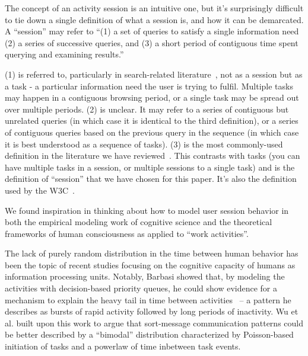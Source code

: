 The concept of an activity session is an intuitive one, but it's surprisingly difficult to tie down a single definition of what a session is, and how it can be demarcated.  A ``session'' may refer to ``(1) a set of queries to satisfy a single information need (2) a series of successive queries, and (3) a short period of contiguous time spent querying and examining results.''~\cite{jones2008beyond}

(1) is referred to, particularly in search-related literature~\cite{eickhoff2014lessons,jones2008beyond}, not as a session but as a task - a particular information need the user is trying to fulfil.  Multiple tasks may happen in a contiguous browsing period, or a single task may be spread out over multiple periods.
(2) is unclear. It may refer to a series of contiguous but unrelated queries (in which case it is identical to the third definition), or a series of contiguous queries based on the previous query in the sequence (in which case it is best understood as a sequence of tasks).
(3) is the most commonly-used definition in the literature we have reviewed~\cite{govseva2006empirical,nadjarbashi2004improving,spiliopoulou2003framework,white2010assessing}. This contrasts with tasks (you can have multiple tasks in a session, or multiple sessions to a single task) and is the definition of ``session'' that we have chosen for this paper. It's also the definition used by the W3C~\cite{W3C1999}.

We found inspiration in thinking about how to model user session behavior in both the empirical modeling work of cognitive science and the theoretical frameworks of human consciousness as applied to ``work activities''.
 
The lack of purely random distribution in the time between human behavior has been the topic of recent studies focusing on the cognitive capacity of humans as information processing units.  Notably, Barbasi showed that, by modeling the activities with decision-based priority queues, he could show evidence for a mechanism to explain the heavy tail in time between activities~\cite{barabasi2005origin} -- a pattern he describes as bursts of rapid activity followed by long periods of inactivity.  Wu et al. built upon this work to argue that sort-message communication patterns could be better described by a ``bimodal'' distribution characterized by Poisson-based initiation of tasks and a powerlaw of time inbetween task events\cite{wu2010evidence}.

